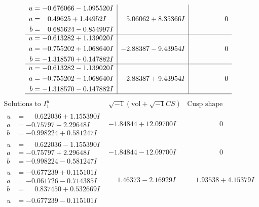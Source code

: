 \documentclass[1p]{elsarticle_modified}
\theoremstyle{definition}
\newcommand{\I}{\sqrt{-1}}
\begin{document}
$$\begin{array}{c|c|c}
\begin{aligned}
u &= -0.676066 - 1.095520 I \\
a &= \phantom{-}0.49625 + 1.44952 I \\
b &= \phantom{-}0.685624 - 0.854997 I\end{aligned}
 & \phantom{-}5.06062 + 8.35366 I & \phantom{-0.000000 } 0 \\ \hline\begin{aligned}
u &= -0.613282 + 1.139020 I \\
a &= -0.755202 + 1.068640 I \\
b &= -1.318570 + 0.147882 I\end{aligned}
 & -2.88387 - 9.43954 I & \phantom{-0.000000 } 0 \\ \hline\begin{aligned}
u &= -0.613282 - 1.139020 I \\
a &= -0.755202 - 1.068640 I \\
b &= -1.318570 - 0.147882 I\end{aligned}
 & -2.88387 + 9.43954 I & \phantom{-0.000000 } 0\\
 \hline 
 \end{array}$$\newpage$$\begin{array}{c|c|c}  
\text{Solutions to }I^u_{1}& \I (\text{vol} + \sqrt{-1}CS) & \text{Cusp shape}\\
 \hline 
\begin{aligned}
u &= \phantom{-}0.622036 + 1.155390 I \\
a &= -0.75797 - 2.29648 I \\
b &= -0.998224 + 0.581247 I\end{aligned}
 & -1.84844 + 12.09700 I & \phantom{-0.000000 } 0 \\ \hline\begin{aligned}
u &= \phantom{-}0.622036 - 1.155390 I \\
a &= -0.75797 + 2.29648 I \\
b &= -0.998224 - 0.581247 I\end{aligned}
 & -1.84844 - 12.09700 I & \phantom{-0.000000 } 0 \\ \hline\begin{aligned}
u &= -0.677239 + 0.115101 I \\
a &= -0.061726 - 0.714385 I \\
b &= \phantom{-}0.837450 + 0.532669 I\end{aligned}
 & \phantom{-}1.46373 - 2.16929 I & \phantom{-}1.93538 + 4.15379 I \\ \hline\begin{aligned}
u &= -0.677239 - 0.115101 I \\

\end{aligned}
\end{array}$$
\end{document}
